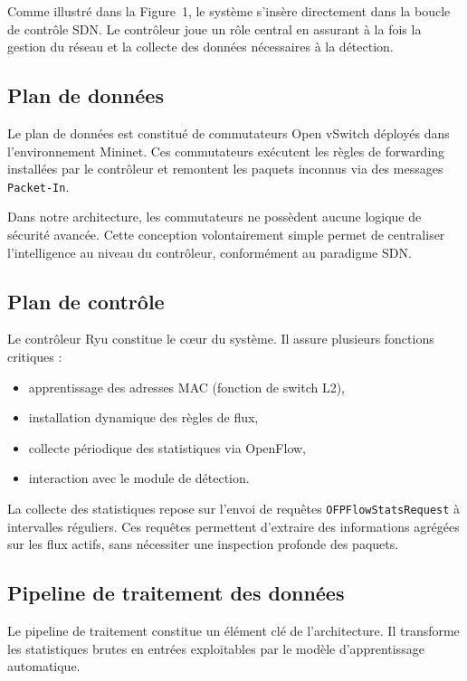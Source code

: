 \documentclass[11pt]{article}
\begin{document}
Comme illustré dans la Figure~1, le système s’insère directement dans la boucle de contrôle SDN. Le contrôleur joue un rôle central en assurant à la fois la gestion du réseau et la collecte des données nécessaires à la détection.

\subsection{Plan de données}

Le plan de données est constitué de commutateurs Open vSwitch déployés dans l’environnement Mininet. Ces commutateurs exécutent les règles de forwarding installées par le contrôleur et remontent les paquets inconnus via des messages \texttt{Packet-In}.

Dans notre architecture, les commutateurs ne possèdent aucune logique de sécurité avancée. Cette conception volontairement simple permet de centraliser l’intelligence au niveau du contrôleur, conformément au paradigme SDN.

\subsection{Plan de contrôle}

Le contrôleur Ryu constitue le cœur du système. Il assure plusieurs fonctions critiques :

\begin{itemize}
    \item apprentissage des adresses MAC (fonction de switch L2),
    \item installation dynamique des règles de flux,
    \item collecte périodique des statistiques via OpenFlow,
    \item interaction avec le module de détection.
\end{itemize}

La collecte des statistiques repose sur l’envoi de requêtes \texttt{OFPFlowStatsRequest} à intervalles réguliers. Ces requêtes permettent d’extraire des informations agrégées sur les flux actifs, sans nécessiter une inspection profonde des paquets.

\subsection{Pipeline de traitement des données}

Le pipeline de traitement constitue un élément clé de l’architecture. Il transforme les statistiques brutes en entrées exploitables par le modèle d’apprentissage automatique.
\end{document}
